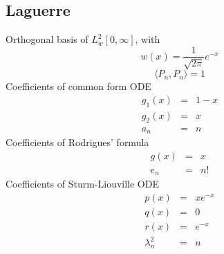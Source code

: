 \documentclass[oneside,a4paper,11pt]{article}
\begin{document}
\subsection{Laguerre}
Orthogonal basis of $L^2_w[0,\infty]$, with
\[w(x) = \frac{1}{\sqrt{2\pi}}e^{-x}\] 
\[\langle P_n,P_n\rangle = 1\]
Coefficients of common form ODE
\begin{eqnarray*}
g_1(x) &=& 1 - x\\
g_2(x) &=& x\\
a_n &=& n
\end{eqnarray*}
Coefficients of Rodrigues' formula
 \begin{eqnarray*}
g(x) &=& x \\
e_n &=& n!
\end{eqnarray*}
Coefficients of Sturm-Liouville ODE
\begin{eqnarray*}
p(x) &=& xe^{-x}\\
q(x) &=& 0\\
r(x) &=& e^{-x}\\
\lambda^2_n &=& n
\end{eqnarray*}
\end{document}
